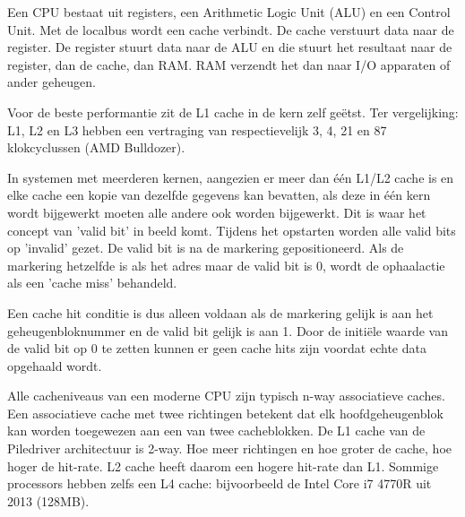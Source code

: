 Een CPU bestaat uit registers, een Arithmetic Logic Unit (ALU) en een Control Unit. 
Met de localbus wordt een cache verbindt. De cache verstuurt data naar de register. 
De register stuurt data naar de ALU en die stuurt het resultaat naar de register, dan de cache, dan RAM. 
RAM verzendt het dan naar I/O apparaten of ander geheugen.

Voor de beste performantie zit de L1 cache in de kern zelf geëtst.
Ter vergelijking: L1, L2 en L3 hebben een vertraging van respectievelijk 3, 4, 21 en 87 klokcyclussen (AMD Bulldozer).

In systemen met meerderen kernen, aangezien er meer dan één L1/L2 cache is en elke cache een kopie van dezelfde gegevens kan bevatten, als deze in één kern wordt bijgewerkt moeten alle andere ook worden bijgewerkt.
Dit is waar het concept van 'valid bit' in beeld komt.
Tijdens het opstarten worden alle valid bits op 'invalid' gezet. De valid bit is na de markering gepositioneerd.
Als de markering hetzelfde is als het adres maar de valid bit is 0, wordt de ophaalactie als een 'cache miss' behandeld.

Een cache hit conditie is dus alleen voldaan als de markering gelijk is aan het geheugenbloknummer en de valid bit gelijk is aan 1. Door de initiële waarde van de valid bit op 0 te zetten kunnen er geen cache hits zijn voordat echte data opgehaald wordt.

Alle cacheniveaus van een moderne CPU zijn typisch n-way associatieve caches. Een associatieve cache met twee richtingen betekent dat elk hoofdgeheugenblok kan worden toegewezen aan een van twee cacheblokken. De L1 cache van de Piledriver architectuur is 2-way.\parencite{Hruska2017}
Hoe meer richtingen en hoe groter de cache, hoe hoger de hit-rate. L2 cache heeft daarom een hogere hit-rate dan L1.
Sommige processors hebben zelfs een L4 cache: bijvoorbeeld de Intel Core i7 4770R uit 2013 (128MB).

